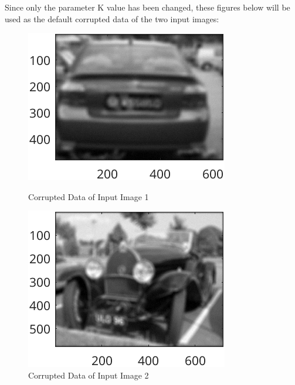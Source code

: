 \documentclass{article}
\begin{document}
	Since only the parameter K value has been changed, these figures below will be used as the default corrupted data of the two input images:
	\begin{figure}[ht]
  	\centering
  	\begin{minipage}[t]{0.45\textwidth}
    	\centering
    	\includegraphics[width=\textwidth]{2AE1Corrupted}
    	\caption{Corrupted Data of Input Image 1}
    	\label{fig:example1corrupted}
  	\end{minipage}\hfill
  	\begin{minipage}[t]{0.45\textwidth}
    	\centering
    	\includegraphics[width=\textwidth]{2AE2Corrupted}
    	\caption{Corrupted Data of Input Image 2}
    	\label{fig:example2corrupted}
  	\end{minipage}
	\end{figure}
\end{document}

